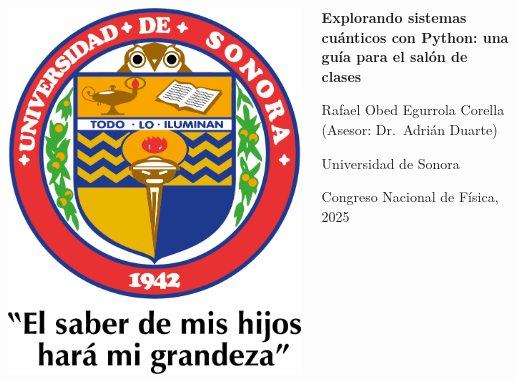 \documentclass[final]{beamer}
\begin{document}
\begin{frame}[t]

\begin{columns}[t,totalwidth=\textwidth]
  \begin{column}{0.1\textwidth}
    \centering
    \includegraphics[width=0.9\linewidth]{logo_unison.png}
  \end{column}

  \begin{column}{0.9\textwidth}
    \centering
    {\bfseries\Huge Explorando sistemas cuánticos con Python: una guía para el salón de clases\par}
    \vspace{1em}
    {\Large Rafael Obed Egurrola Corella \quad (Asesor: Dr.\ Adrián Duarte)\par}
    \vspace{0.5em}
    {\large Universidad de Sonora\par}
    \vspace{0.5em}
    {\large Congreso Nacional de Física, 2025\par}
  \end{column}

\end{columns}


\end{frame}
\end{document}
